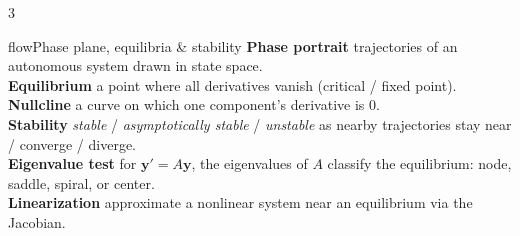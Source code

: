 \documentclass[10pt]{article}
\newcommand{\lab}[1]{\textcolor{ink}{\sffamily\footnotesize\textbf{#1}}\;}
\begin{document}
\begin{multicols}{3}
\begin{card}{flow}{Phase plane, equilibria \& stability}
\lab{Phase portrait} trajectories of an autonomous system drawn in state space.\\
\lab{Equilibrium} a point where all derivatives vanish (critical / fixed point).\\
\lab{Nullcline} a curve on which one component's derivative is $0$.\\
\lab{Stability} \emph{stable} / \emph{asymptotically stable} / \emph{unstable} as nearby trajectories stay near / converge / diverge.\\
\lab{Eigenvalue test} for $\mathbf{y}'=A\mathbf{y}$, the eigenvalues of $A$ classify the equilibrium: node, saddle, spiral, or center.\\
\lab{Linearization} approximate a nonlinear system near an equilibrium via the Jacobian.
\end{card}

\end{multicols}
\end{document}
